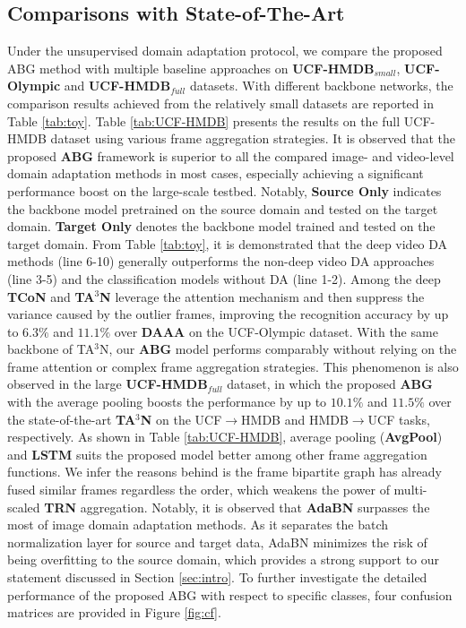 \subsection{Comparisons with State-of-The-Art}
 Under the unsupervised domain adaptation protocol, we compare the proposed ABG method with multiple baseline approaches on \textbf{UCF-HMDB$_{small}$}, \textbf{UCF-Olympic} and \textbf{UCF-HMDB$_{full}$} datasets. With different backbone networks, the comparison results achieved from the relatively small datasets are reported in Table \ref{tab:toy}. Table \ref{tab:UCF-HMDB} presents the results on the full UCF-HMDB dataset using various frame aggregation strategies. It is observed that the proposed \textbf{ABG} framework is superior to all the compared image- and video-level domain adaptation methods in most cases, especially achieving a significant performance boost on the large-scale testbed. Notably, \textbf{Source Only} indicates the backbone model pretrained on the source domain and tested on the target domain. \textbf{Target Only} denotes the backbone model trained and tested on the target domain. From Table \ref{tab:toy}, it is demonstrated that the deep video DA methods (line 6-10) generally outperforms the non-deep video DA approaches (line 3-5) and the classification models without DA (line 1-2). Among the deep \textbf{TCoN} and \textbf{TA$^3$N} leverage the attention mechanism and then suppress the variance caused by the outlier frames, improving the recognition accuracy by up to $6.3\%$ and $11.1\%$ over \textbf{DAAA} on the UCF-Olympic dataset. With the same backbone of TA$^3$N, our \textbf{ABG} model performs comparably without relying on the frame attention or complex frame aggregation strategies. This phenomenon is also observed in the large \textbf{UCF-HMDB$_{full}$} dataset, in which the proposed \textbf{ABG} with the average pooling boosts the performance by up to $10.1\%$ and $11.5\%$ over the state-of-the-art \textbf{TA$^3$N} on the UCF$\rightarrow$HMDB and HMDB$\rightarrow$UCF tasks, respectively. As shown in Table \ref{tab:UCF-HMDB}, average pooling (\textbf{AvgPool}) and \textbf{LSTM} suits the proposed model better among other frame aggregation functions. We infer the reasons behind is the frame bipartite graph has already fused similar frames regardless the order, which weakens the power of multi-scaled \textbf{TRN} aggregation. Notably, it is observed that \textbf{AdaBN} surpasses the most of image domain adaptation methods. As it separates the batch normalization layer for source and target data, AdaBN minimizes the risk of being overfitting to the source domain, which provides a strong support to our statement discussed in Section \ref{sec:intro}. To further investigate the detailed performance of the proposed ABG with respect to specific classes, four confusion matrices are provided in Figure \ref{fig:cf}.



